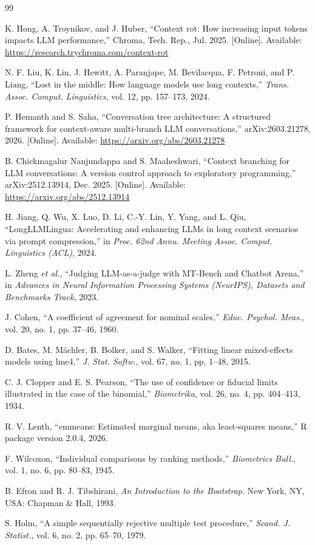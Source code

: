 \documentclass[conference]{IEEEtran}
\theoremstyle{definition}
\begin{document}
\begin{thebibliography}{99}

K. Hong, A. Troynikov, and J. Huber, ``Context rot: How increasing input tokens impacts LLM performance,'' Chroma, Tech. Rep., Jul. 2025. [Online]. Available: \url{https://research.trychroma.com/context-rot}

N. F. Liu, K. Lin, J. Hewitt, A. Paranjape, M. Bevilacqua, F. Petroni, and P. Liang, ``Lost in the middle: How language models use long contexts,'' \emph{Trans. Assoc. Comput. Linguistics}, vol. 12, pp. 157--173, 2024.

P. Hemanth and S. Saha, ``Conversation tree architecture: A structured framework for context-aware multi-branch LLM conversations,'' arXiv:2603.21278, 2026. [Online]. Available: \url{https://arxiv.org/abs/2603.21278}

B. Chickmagalur Nanjundappa and S. Maaheshwari, ``Context branching for LLM conversations: A version control approach to exploratory programming,'' arXiv:2512.13914, Dec. 2025. [Online]. Available: \url{https://arxiv.org/abs/2512.13914}

H. Jiang, Q. Wu, X. Luo, D. Li, C.-Y. Lin, Y. Yang, and L. Qiu, ``LongLLMLingua: Accelerating and enhancing LLMs in long context scenarios via prompt compression,'' in \emph{Proc. 62nd Annu. Meeting Assoc. Comput. Linguistics (ACL)}, 2024.

L. Zheng \emph{et al.}, ``Judging LLM-as-a-judge with MT-Bench and Chatbot Arena,'' in \emph{Advances in Neural Information Processing Systems (NeurIPS), Datasets and Benchmarks Track}, 2023.

J. Cohen, ``A coefficient of agreement for nominal scales,'' \emph{Educ. Psychol. Meas.}, vol. 20, no. 1, pp. 37--46, 1960.

D. Bates, M. M\"achler, B. Bolker, and S. Walker, ``Fitting linear mixed-effects models using lme4,'' \emph{J. Stat. Softw.}, vol. 67, no. 1, pp. 1--48, 2015.

C. J. Clopper and E. S. Pearson, ``The use of confidence or fiducial limits illustrated in the case of the binomial,'' \emph{Biometrika}, vol. 26, no. 4, pp. 404--413, 1934.

R. V. Lenth, ``emmeans: Estimated marginal means, aka least-squares means,'' R package version 2.0.4, 2026.

F. Wilcoxon, ``Individual comparisons by ranking methods,'' \emph{Biometrics Bull.}, vol. 1, no. 6, pp. 80--83, 1945.

B. Efron and R. J. Tibshirani, \emph{An Introduction to the Bootstrap}. New York, NY, USA: Chapman \& Hall, 1993.

S. Holm, ``A simple sequentially rejective multiple test procedure,'' \emph{Scand. J. Statist.}, vol. 6, no. 2, pp. 65--70, 1979.

\end{thebibliography}
\end{document}
